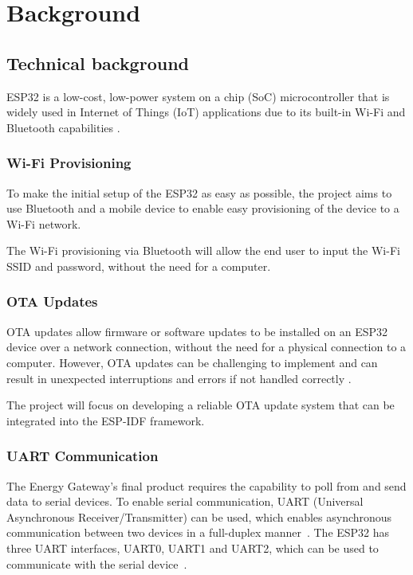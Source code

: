 \section{Background}
\label{sec:background}

\subsection{Technical background}
\label{sec:technical}
ESP32 is a low-cost, low-power system on a chip (SoC) microcontroller that is widely used in Internet of Things (IoT) applications due to its built-in Wi-Fi and Bluetooth capabilities \cite{espressif:popularity} \cite{espressif:esp32_datasheet}.

\subsubsection{Wi-Fi Provisioning}
\label{subsec:bluetooth}
To make the initial setup of the ESP32 as easy as possible, the project aims to use Bluetooth and a mobile device to enable easy provisioning of the device to a Wi-Fi network.

The Wi-Fi provisioning via Bluetooth will allow the end user to input the Wi-Fi SSID and password, without the need for a computer.

\subsubsection{OTA Updates}
\label{subsec:ota}
OTA updates allow firmware or software updates to be installed on an ESP32 device over a network connection, without the need for a physical connection to a computer. However, OTA updates can be challenging to implement and can result in unexpected interruptions and errors if not handled correctly \cite{Arakadakis:2021}.

The project will focus on developing a reliable OTA update system that can be integrated into the ESP-IDF framework.

\subsubsection{UART Communication}\label{subsec:uart}
The Energy Gateway's final product requires the capability to poll from and send data to serial devices. To enable serial communication, UART (Universal Asynchronous Receiver/Transmitter) can be used, which enables asynchronous communication between two devices in a full-duplex manner~\cite{philips:uart}. The ESP32 has three UART interfaces, UART0, UART1 and UART2, which can be used to communicate with the serial device~\cite{espressif:esp32_datasheet}.

